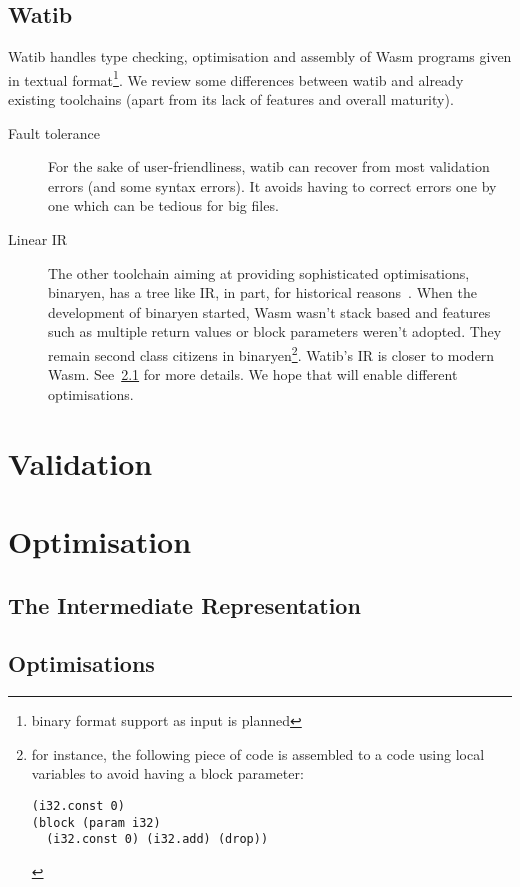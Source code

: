 \documentclass[11pt]{article}
\begin{document}
\subsection{Watib}
Watib handles type checking, optimisation and assembly of Wasm programs given in
textual format\footnote{binary format support as input is planned}. We review
some differences between watib and already existing toolchains (apart from its
lack of features and overall maturity).
\begin{description}
\item[Fault tolerance] For the sake of user-friendliness, watib can recover from
  most validation errors (and some syntax errors). It avoids having to correct
  errors one by one which can be tedious for big files.
\item[Linear IR] The other toolchain aiming at providing sophisticated
  optimisations, binaryen, has a tree like IR, in part, for historical
  reasons~\cite{BinaryenIR}. When the development of binaryen started, Wasm
  wasn't stack based and features such as multiple return values or block
  parameters weren't adopted. They remain second class citizens in
  binaryen\footnote{for instance, the following piece of code is assembled to a
  code using local variables to avoid having a block parameter:
\begin{verbatim}(i32.const 0)
(block (param i32)
  (i32.const 0) (i32.add) (drop))
\end{verbatim}
}. Watib's IR is closer to modern Wasm. See~\ref{ir} for more details. We hope
  that will enable different optimisations.
\end{description}
\section{Validation}
\section{Optimisation}
\subsection{The Intermediate Representation}\label{ir}
\subsection{Optimisations}
\printbibliography
\end{document}
